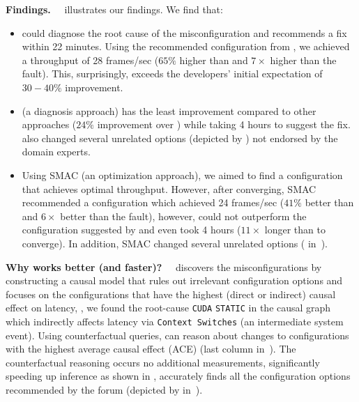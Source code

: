 \noindent\textbf{Findings.~}~ illustrates our findings. We find that:
\begin{itemize}
    \item \ourapproach could diagnose the root cause of the misconfiguration and recommends a fix within 22 minutes. Using the recommended configuration from \ourapproach, we achieved a throughput of 28 frames/sec ($65\%$ higher than \txone and $7\times$ higher than the fault). This, surprisingly, exceeds the developers' initial expectation of $30-40\%$ improvement. %
    \item \bugdoc (a diagnosis approach) has the least improvement compared to other approaches ($24\%$ improvement over \txone) while taking 4 hours to suggest the fix. \bugdoc also changed several unrelated options (depicted by \colorbox{orange!12}{\color{gray50}{\faCheck}}) not endorsed by the domain experts. 
    \item Using SMAC (an optimization approach), we aimed to find a configuration that achieves optimal throughput. However, after converging, SMAC recommended a configuration which achieved 24 frames/sec ($41\%$ better than \txone and $6\times$ better than the fault), however, could not outperform the configuration suggested by \ourapproach and even took 4 hours ($11\times$ longer than \ourapproach to converge). In addition, SMAC changed several unrelated options (\colorbox{orange!12}{\color{gray50}{\faCheck}} in~). 
\end{itemize}

  



\noindent\textbf{Why \ourapproach works better (and faster)?~}~%
\ourapproach discovers the misconfigurations by constructing a causal model that rules out irrelevant configuration options and focuses on the configurations that have the highest (direct or indirect) causal effect on latency, \eg, we found the root-cause \texttt{CUDA} \texttt{STATIC} in the causal graph which indirectly affects latency via \texttt{Context Switches} (an intermediate system event). Using counterfactual queries, \ourapproach can reason about changes to configurations with the highest average causal effect (ACE) (last column in~). The counterfactual reasoning occurs no additional measurements, significantly speeding up inference as shown in , \ourapproach accurately finds all the configuration options recommended by the forum (depicted by \colorbox{blue!10}{\color{gray50}{\faCheck}} in~).


